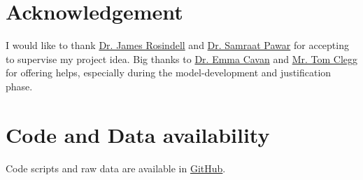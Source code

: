 \documentclass[../thesis.tex]{subfiles} %
\begin{document}
\section{Acknowledgement}
I would like to thank \href{mailto:j.rosindell@imperial.ac.uk}{Dr. James Rosindell} and \href{mailto:s.pawar@imperial.ac.uk}{Dr. Samraat Pawar} for accepting to supervise my project idea.  
Big thanks to \href{mailto:e.cavan@imperial.ac.uk}{Dr. Emma Cavan} and \href{mailto:t.clegg17@imperial.ac.uk}{Mr. Tom Clegg} for offering helps, especially during the model-development and justification phase.


\section{Code and Data availability}
Code scripts and raw data are available in \href{https://github.com/ph-u/Project}{GitHub}.
\end{document}
